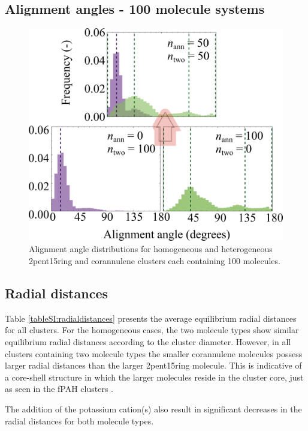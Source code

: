 \subsection{Alignment angles - 100 molecule systems}
%
\begin{figure}[!tbh]
\centering
\includegraphics[width=0.5\linewidth]{Figures/alignment_angle_hetero_SI_draft.png}
\caption{Alignment angle distributions for homogeneous and heterogeneous 2pent15ring and corannulene clusters each containing 100 molecules.}
\label{figSI:alignmentangles_100}
\end{figure}
%

\subsection{Radial distances}
Table \ref{tableSI:radialdistances} presents the average equilibrium radial distances for all clusters.  For the homogeneous cases, the two molecule types show similar equilibrium radial distances according to the cluster diameter.  However, in all clusters containing two molecule types the smaller corannulene molecules possess larger radial distances than the larger 2pent15ring molecule.  This is indicative of a core-shell structure in which the larger molecules reside in the cluster core, just as seen in the fPAH clusters \cite{bowal2018partitioning}.

The addition of the potassium cation(s) also result in significant decreases in the radial distances for both molecule types.


